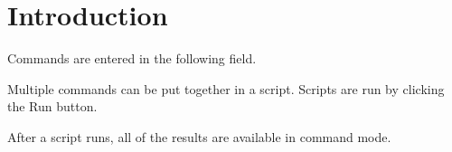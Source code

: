 \documentclass[12pt]{article}
\begin{document}
\section*{Introduction}

Commands are entered in the following field.

\begin{center}
\end{center}

Multiple commands can be put together in a script.
Scripts are run by clicking the Run button.

\begin{center}
\end{center}

After a script runs, all of the results are available in command mode.
\end{document}
